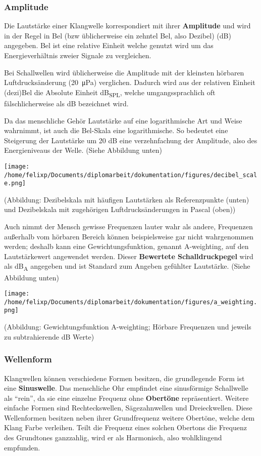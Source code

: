 \subsubsection{Amplitude}
\label{sec:org9aed8b8}
Die Lautstärke einer Klangwelle korrespondiert mit ihrer \textbf{Amplitude} und wird in der Regel in Bel (bzw üblicherweise ein zehntel Bel, also Dezibel) (\si{\dB}) angegeben. Bel ist eine relative Einheit welche genutzt wird um das Energieverhältnis zweier Signale zu vergleichen.

Bei Schallwellen wird üblicherweise die Amplitude mit der kleinsten hörbaren Luftdrucksänderung (\SI{20}{\micro\pascal}) verglichen. Dadurch wird aus der relativen Einheit (dezi)Bel die Absolute Einheit \si{\dB}\textsubscript{SPL}, welche umgangssprachlich oft fälschlicherweise als \si{\dB} bezeichnet wird.

Da das menschliche Gehör Lautstärke auf eine logarithmische Art und Weise wahrnimmt, ist auch die Bel-Skala eine logarithmische. So bedeutet eine Steigerung der Lautstärke um 20 \si{\dB} eine verzehnfachung der Amplitude, also des Energieniveaus der Welle. (Siehe Abbildung unten)

\begin{center}
\texttt{[image: /home/felixp/Documents/diplomarbeit/dokumentation/figures/decibel\_scale.png]}
\end{center}
(Abbildung: Dezibelskala mit häufigen Lautstärken als Referenzpunkte (unten) und Dezibelskala mit zugehörigen Luftdrucksänderungen in Pascal (oben))

Auch nimmt der Mensch gewisse Frequenzen lauter wahr als andere, Frequenzen außerhalb vom hörbaren Bereich können beispielsweise gar nicht wahrgenommen werden; deshalb kann eine Gewichtungsfunktion, genannt A-weighting, auf den Lautstärkewert angewendet werden. Dieser \textbf{Bewertete Schalldruckpegel} wird als \si{\dB}\textsubscript{A} angegeben und ist Standard zum Angeben gefühlter Lautstärke. (Siehe Abbildung unten)

\begin{center}
\texttt{[image: /home/felixp/Documents/diplomarbeit/dokumentation/figures/a\_weighting.png]}
\end{center}
(Abbildung: Gewichtungsfunktion A-weighting; Hörbare Frequenzen und jeweils zu subtrahierende \si{\dB} Werte)

\subsubsection{Wellenform}
\label{sec:org8cd784d}
Klangwellen können verschiedene Formen besitzen, die grundlegende Form ist eine \textbf{Sinuswelle}. Das menschliche Ohr empfindet eine sinusförmige Schallwelle als "`rein"', da sie eine einzelne Frequenz ohne \textbf{Obertöne} repräsentiert. Weitere einfache Formen sind Rechteckswellen, Sägezahnwellen und Dreieckwellen. Diese Wellenformen besitzen neben ihrer Grundfrequenz weitere Obertöne, welche dem Klang Farbe verleihen. Teilt die Frequenz eines solchen Obertons die Frequenz des Grundtones ganzzahlig, wird er als Harmonisch, also wohlklingend empfunden.

